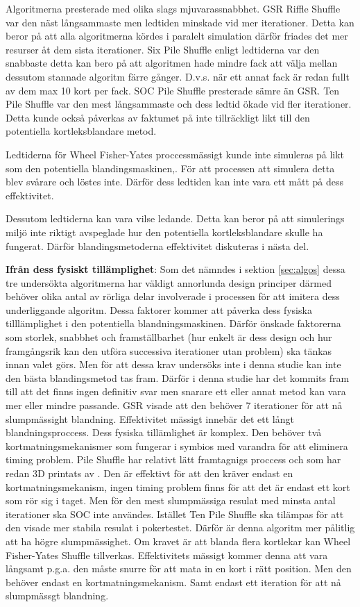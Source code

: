 \documentclass[swedish,a4paper]{article}
\begin{document}
Algoritmerna presterade med olika slags mjuvarassnabbhet. GSR Riffle Shuffle var
den näst långsammaste men ledtiden minskade vid mer iterationer. Detta kan
beror på att alla algoritmerna kördes i paralelt simulation därför friades det
mer resurser åt dem sista iterationer. Six Pile Shuffle enligt ledtiderna var
den snabbaste detta kan bero på att algoritmen hade mindre fack att välja mellan
dessutom stannade algoritm färre gånger. D.v.s. när ett annat fack är redan
fullt av dem max 10 kort per fack. SOC Pile Shuffle presterade sämre än GSR. Ten
Pile Shuffle var den mest långsammaste och dess ledtid ökade vid fler
iterationer. Detta kunde också påverkas av faktumet på inte tillräckligt likt
till den potentiella kortleksblandare metod.

Ledtiderna för Wheel Fisher-Yates  proccessmässigt kunde inte simuleras på likt
som den potentiella blandingsmaskinen,. För att processen att simulera detta
blev svårare och löstes inte.  Därför dess ledtiden kan inte vara ett mått på
dess effektivitet.

Dessutom ledtiderna kan vara vilse ledande. Detta kan beror på att
simulerings miljö inte riktigt avspeglade hur den potentiella kortleksblandare
skulle ha fungerat. Därför blandingsmetoderna effektivitet diskuteras i nästa
del.


\textbf{Ifrån dess fysiskt tillämplighet}:
Som det nämndes i sektion \ref{sec:algos} dessa tre undersökta algoritmerna har
väldigt annorlunda design principer därmed behöver olika antal av rörliga delar
involverade i processen för att imitera dess underliggande algoritm. Dessa
faktorer kommer att påverka dess fysiska tilllämplighet i den potentiella
blandningsmaskinen. Därför önskade faktorerna som storlek, snabbhet och
framställbarhet (hur enkelt är dess design och  hur framgångsrik kan den utföra
successiva iterationer utan problem) ska tänkas innan valet görs. Men för att
dessa krav undersöks inte i denna studie kan inte den bästa blandingsmetod tas
fram. Därför i denna studie har det kommits fram till att det finns ingen
definitiv svar men snarare ett eller annat metod kan vara mer eller mindre
passande. GSR visade att den behöver 7 iterationer för att nå slumpmässight
blandning. Effektivitet mässigt innebär det ett långt blandningsproccess. Dess
fysiska tillämlighet är komplex. Den behöver två kortmatningsmekanismer som
fungerar i symbios med varandra för att eliminera timing problem. Pile Shuffle
har relativt lätt framtagnigs proccess och som har redan 3D printats av
\parencite{3DprintedLife2021}. Den är effektivt för att den kräver endast en
kortmatningsmekanism, ingen timing problem finns för att det är endast ett kort
som rör sig i taget. Men för den mest slumpmässiga resulat med minsta antal
iterationer ska SOC inte användes. Istället Ten Pile Shuffle ska tilämpas för
att den visade mer stabila resulat i pokertestet. Därför är denna algoritm mer
pålitlig att ha högre slumpmässighet. Om kravet är att blanda flera
kortlekar kan Wheel Fisher-Yates Shuffle tillverkas. Effektivitets mässigt kommer
denna att vara långsamt p.g.a. den måste snurre för att mata in en kort i
rätt position. Men den behöver endast en kortmatningsmekanism. Samt endast ett
iteration för att nå slumpmässgt blandning.
\end{document}
